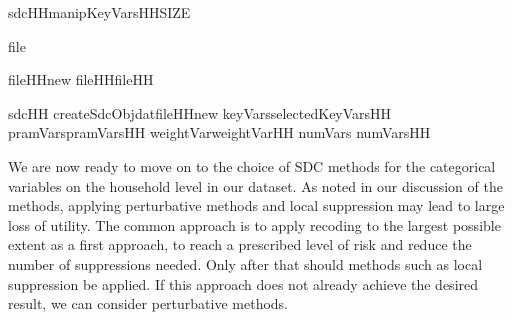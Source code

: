 \documentclass[letterpaper,10pt,english]{sphinxmanual}
\begin{document}
\def\sphinxLiteralBlockLabel{\label{\detokenize{case_studies:code915}}}
%
\begin{sphinxVerbatim}[commandchars=\\\{\},numbers=left,firstnumber=1,stepnumber=1]
sdcHHmanipKeyVarsHHSIZE

file  \PYG{p}{[}\PYG{p}{[}\PYG{p}{]}  \PYG{p}{]}

fileHHnew  fileHH\PYG{p}{[}fileHH\PYG{p}{[}\PYG{p}{]}  \PYG{p}{]}

sdcHH  createSdcObjdatfileHHnew keyVarsselectedKeyVarsHH pramVarspramVarsHH
                      weightVarweightVarHH numVars  numVarsHH
\end{sphinxVerbatim}


We are now ready to move on to the choice of SDC methods for the
categorical variables on the household level in our dataset. As noted in
our discussion of the methods, applying perturbative methods and local
suppression may lead to large loss of utility. The common approach is to
apply recoding to the largest possible extent as a first approach, to
reach a prescribed level of risk and reduce the number of suppressions
needed. Only after that should methods such as local suppression be
applied. If this approach does not already achieve the desired result,
we can consider perturbative methods.
\end{document}
